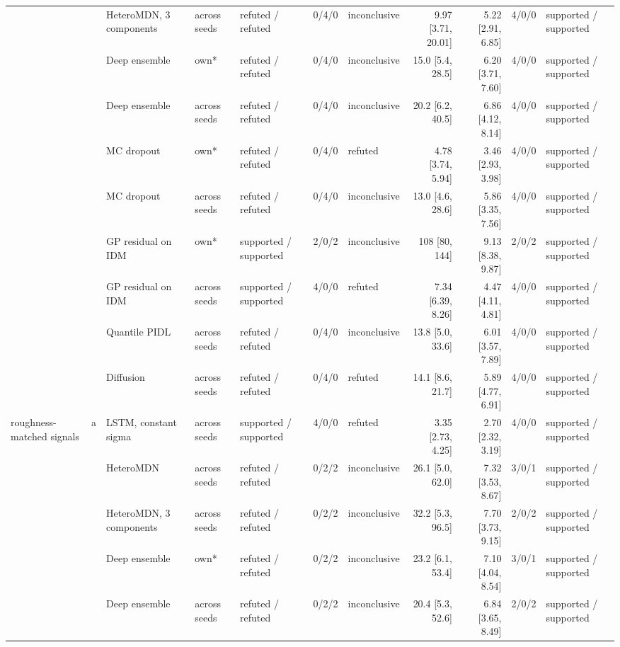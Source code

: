 \begin{longtable}{lllllrlrrrl}
 &  & HeteroMDN, 3 components & across seeds & refuted / refuted & 0/4/0 & inconclusive & 9.97 [3.71, 20.01] & 5.22 [2.91, 6.85] & 4/0/0 & supported / supported \\
 &  & Deep ensemble & own* & refuted / refuted & 0/4/0 & inconclusive & 15.0 [5.4, 28.5] & 6.20 [3.71, 7.60] & 4/0/0 & supported / supported \\
 &  & Deep ensemble & across seeds & refuted / refuted & 0/4/0 & inconclusive & 20.2 [6.2, 40.5] & 6.86 [4.12, 8.14] & 4/0/0 & supported / supported \\
 &  & MC dropout & own* & refuted / refuted & 0/4/0 & refuted & 4.78 [3.74, 5.94] & 3.46 [2.93, 3.98] & 4/0/0 & supported / supported \\
 &  & MC dropout & across seeds & refuted / refuted & 0/4/0 & inconclusive & 13.0 [4.6, 28.6] & 5.86 [3.35, 7.56] & 4/0/0 & supported / supported \\
 &  & GP residual on IDM & own* & supported / supported & 2/0/2 & inconclusive & 108 [80, 144] & 9.13 [8.38, 9.87] & 2/0/2 & supported / supported \\
 &  & GP residual on IDM & across seeds & supported / supported & 4/0/0 & refuted & 7.34 [6.39, 8.26] & 4.47 [4.11, 4.81] & 4/0/0 & supported / supported \\
 &  & Quantile PIDL & across seeds & refuted / refuted & 0/4/0 & inconclusive & 13.8 [5.0, 33.6] & 6.01 [3.57, 7.89] & 4/0/0 & supported / supported \\
 &  & Diffusion & across seeds & refuted / refuted & 0/4/0 & refuted & 14.1 [8.6, 21.7] & 5.89 [4.77, 6.91] & 4/0/0 & supported / supported \\
\midrule
roughness-matched signals & a & LSTM, constant sigma & across seeds & supported / supported & 4/0/0 & refuted & 3.35 [2.73, 4.25] & 2.70 [2.32, 3.19] & 4/0/0 & supported / supported \\
 &  & HeteroMDN & across seeds & refuted / refuted & 0/2/2 & inconclusive & 26.1 [5.0, 62.0] & 7.32 [3.53, 8.67] & 3/0/1 & supported / supported \\
 &  & HeteroMDN, 3 components & across seeds & refuted / refuted & 0/2/2 & inconclusive & 32.2 [5.3, 96.5] & 7.70 [3.73, 9.15] & 2/0/2 & supported / supported \\
 &  & Deep ensemble & own* & refuted / refuted & 0/2/2 & inconclusive & 23.2 [6.1, 53.4] & 7.10 [4.04, 8.54] & 3/0/1 & supported / supported \\
 &  & Deep ensemble & across seeds & refuted / refuted & 0/2/2 & inconclusive & 20.4 [5.3, 52.6] & 6.84 [3.65, 8.49] & 2/0/2 & supported / supported \\

\end{longtable}
